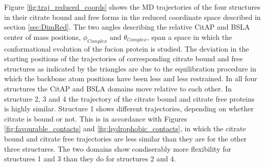 \documentclass[english, a4paper, 12pt, titlepage, draft]{article}
\begin{document}
Figure \ref{fig:traj_reduced_coords} shows the MD trajectories of the four structures in their citrate bound and free forms in the reduced coordinate space described in section \ref{sec:DimRed}.
The two angles describing the relative CitAP and BSLA center of mass positions, $\phi_{Complex}$ and $\theta_{Complex}$, span a space in which the conformational evolution of the fucion protein is studied.
The deviation in the starting positions of the trajectories of corresponding citrate bound and free structures as indicated by the triangles are due to the equilibration procedure in which the backbone atom positions have been less and less restrained.
In all four structures the CitAP and BSLA domains move relative to each other.
In structure 2, 3 and 4 the trajectory of the citrate bound and citrate free proteins is highly similar.
Structure 1 shows different trajectories, depending on whether citrate is bound or not.
This is in accordance with Figures \ref{fig:favourable_contacts} and \ref{fig:hydrophobic_contacts}, in which the citrate bound and citrate free trajectories are less similar than they are for the other three structures.
The two domains show condiserably more flexibility for structures 1 and 3 than they do for structures 2 and 4.
\end{document}
